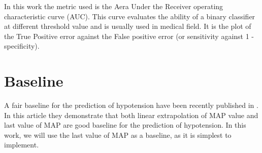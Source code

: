 \documentclass[a4paper,12pt]{article}
\begin{document}
In this work the metric used is the Aera Under the Receiver operating characteristic curve (AUC). This curve evaluates the ability of a binary classifier at different threshold value and is usually used in medical field. It is the plot of the True Positive error against the False positive error (or sensitivity against 1 - specificity).

\section{Baseline}

A fair baseline for the prediction of hypotension have been recently published in \cite{jacquet-lagrezePredictionIntraoperativeHypotension2022}. In this article they demonstrate that both linear extrapolation of MAP value and last value of MAP are good baseline for the prediction of hypotension. In this work, we will use the last value of MAP as a baseline, as it is simplest to implement. \medskip




\end{document}
